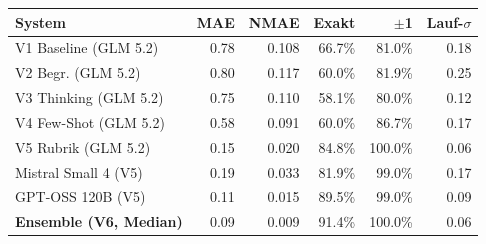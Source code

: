 \begin{tabular}{lrrrrr}
\toprule
System & MAE & NMAE & Exakt & $\pm$1 & Lauf-$\sigma$ \\
\midrule
V1 Baseline (GLM 5.2) & 0.78 & 0.108 & 66.7\% & 81.0\% & 0.18 \\
V2 Begr. (GLM 5.2) & 0.80 & 0.117 & 60.0\% & 81.9\% & 0.25 \\
V3 Thinking (GLM 5.2) & 0.75 & 0.110 & 58.1\% & 80.0\% & 0.12 \\
V4 Few-Shot (GLM 5.2) & 0.58 & 0.091 & 60.0\% & 86.7\% & 0.17 \\
V5 Rubrik (GLM 5.2) & 0.15 & 0.020 & 84.8\% & 100.0\% & 0.06 \\
\midrule
Mistral Small 4 (V5) & 0.19 & 0.033 & 81.9\% & 99.0\% & 0.17 \\
GPT-OSS 120B (V5) & 0.11 & 0.015 & 89.5\% & 99.0\% & 0.09 \\
\midrule
\textbf{Ensemble (V6, Median)} & 0.09 & 0.009 & 91.4\% & 100.0\% & 0.06 \\
\bottomrule
\end{tabular}